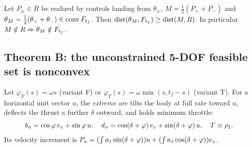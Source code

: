 \begin{lemma}\label{lem:reduction}
Let $P_\pm\in R$ be realized by controls landing from $\theta_\pm$, $M=\tfrac12(P_++P_-)$ and
$\theta_M=\tfrac12(\theta_++\theta_-)\in\operatorname{conv}F_{t_f}$. Then $\operatorname{dist}(\theta_M,F_{t_f})\ge\operatorname{dist}(M,R)$. In particular
$M\notin R\Rightarrow\theta_M\notin F_{t_f}$.\Slean
\end{lemma}

\subsection{Theorem B: the unconstrained 5-DOF feasible set is nonconvex}\label{sec:B}
Let $\varphi_F(s)=\omega s$ (variant F) or $\varphi_T(s)=\omega\min(s,t_f-s)$ (variant T). For a horizontal unit vector $u$,
the \emph{extreme arc} tilts the body at full rate toward $u$, deflects the thrust a further $\delta$ outward, and
holds minimum throttle:
\begin{equation}\label{eq:arcs}
b_u=\cos\varphi\,e_z+\sin\varphi\,u,\quad d_u=\cos(\delta+\varphi)\,e_z+\sin(\delta+\varphi)\,u,\quad T\equiv\rho_1 .
\end{equation}
Its velocity increment is $P_u=(\int a_1\sin(\delta+\varphi))u+(\int a_1\cos(\delta+\varphi))e_z$.

